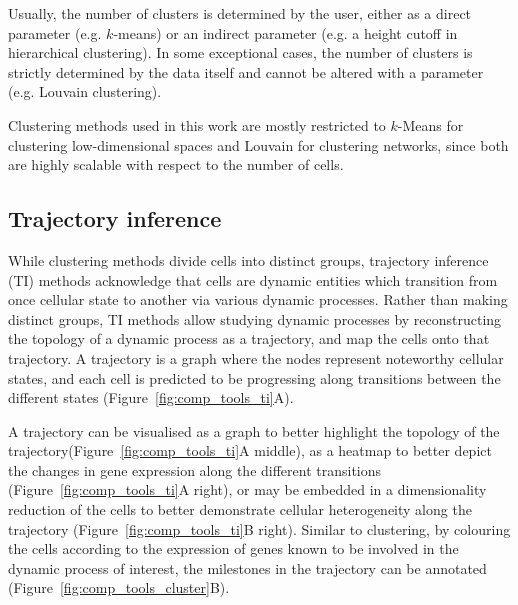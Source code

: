 Usually, the number of clusters is determined by the user, either as a direct parameter (e.g. $k$-means\cite{lloyd_leastsquaresquantization_1982}) or an indirect parameter (e.g. a height cutoff in hierarchical clustering). In some exceptional cases, the number of clusters is strictly determined by the data itself and cannot be altered with a parameter (e.g. Louvain clustering\cite{blondel_fastunfoldingcommunities_2008}).

Clustering methods used in this work are mostly restricted to $k$-Means for clustering low-dimensional spaces and Louvain for clustering networks, since both are highly scalable with respect to the number of cells.

\subsection{Trajectory inference}
While clustering methods divide cells into distinct groups, trajectory inference (TI) methods acknowledge that cells are dynamic entities which transition from once cellular state to another via various dynamic processes. Rather than making distinct groups, TI methods allow studying dynamic processes by reconstructing the topology of a dynamic process as a trajectory, and map the cells onto that trajectory. A trajectory is a graph where the nodes represent noteworthy cellular states, and each cell is predicted to be progressing along transitions between the different states (Figure~\ref{fig:comp_tools_ti}A).

A trajectory can be visualised as a graph to better highlight the topology of the trajectory(Figure~\ref{fig:comp_tools_ti}A middle), as a heatmap to better depict the changes in gene expression along the different transitions (Figure~\ref{fig:comp_tools_ti}A right), or may be embedded in a dimensionality reduction of the cells to better demonstrate cellular heterogeneity along the trajectory (Figure~\ref{fig:comp_tools_ti}B right). Similar to clustering, by colouring the cells according to the expression of genes known to be involved in the dynamic process of interest, the milestones in the trajectory can be annotated (Figure~\ref{fig:comp_tools_cluster}B). 

